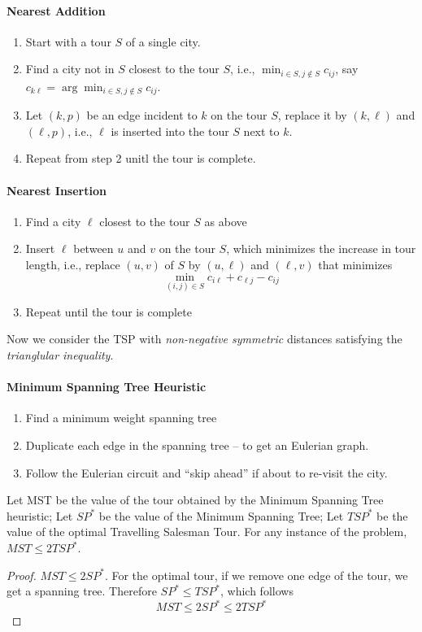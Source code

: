 \paragraph{Nearest Addition}
\begin{enumerate}
\item
Start with a tour $S$ of a single city.
\item
Find a city not in $S$ closest to the tour $S$, i.e., $\min_{i\in S,j\notin S}c_{ij}$, say $c_{k\ell}=\arg\min_{i\in S,j\notin S}c_{ij}$.
\item
Let $(k,p)$ be an edge incident to $k$ on the tour $S$, replace it by $(k,\ell)$ and $(\ell,p)$, i.e., $\ell$ is inserted into the tour $S$ next to $k$.
\item
Repeat from step 2 unitl the tour is complete.
\end{enumerate}



\paragraph{Nearest Insertion}
\begin{enumerate}
\item
Find a city $\ell$ closest to the tour $S$ as above
\item
Insert $\ell$ between $u$ and $v$ on the tour $S$,
which minimizes the increase in tour length, i.e., replace $(u,v)$ of $S$
by $(u,\ell)$ and $(\ell,v)$ that minimizes
\[
\min_{(i,j)\in S}c_{i\ell}+c_{\ell j}-c_{ij}
\]
\item
Repeat until the tour is complete
\end{enumerate}

Now we consider the TSP with \emph{non-negative symmetric} distances satisfying the \emph{trianglular inequality}.
\paragraph{Minimum Spanning Tree Heuristic}
\begin{enumerate}
\item
Find a minimum weight spanning tree
\item
Duplicate each edge in the spanning tree – to get an Eulerian graph.
\item
Follow the Eulerian circuit and ``skip ahead'' if about to re-visit the city.
\end{enumerate}
\begin{theorem}
Let MST be the value of the tour obtained by the Minimum Spanning Tree heuristic;
Let $SP^*$ be the value of the Minimum Spanning Tree;
Let $TSP^*$ be the value of the optimal Travelling Salesman Tour.
For any instance of the problem, $MST\le 2TSP^*$.
\end{theorem}
\begin{proof}
$MST\le 2SP^*$. For the optimal tour, if we remove one edge of the tour, we get a spanning tree.
Therefore $SP^*\le TSP^*$, which follows
\[
MST\le2 SP^*\le 2TSP^*
\]
\end{proof}

